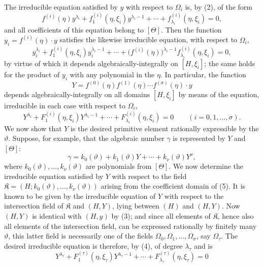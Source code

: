 \documentclass[11pt]{article}
\begin{document}
The irreducible equation satisfied by $y$ with respect to $\Omega_i$ is, by (2),
of the form
\[
 f^{(i)}(\eta)y^{\lambda_i}+f_1^{(i)}(\eta,\xi_i)y^{\lambda_i-1}
+\cdots+f_{\lambda_i}^{(i)}(\eta,\xi_i)=0,
\]
and all coefficients of this equation belong to $[\Theta]$. Then the function
$y_i=f^{(i)}(\eta)\cdot y$ satisfies the likewise irreducible equation, with
respect to $\Omega_i$,
\[
 y_i^{\lambda_i}+f_1^{(i)}(\eta,\xi_i)y_i^{\lambda_i-1}
+\cdots+\bigl(f^{(i)}(\eta)\bigr)^{\lambda_i-1}
 f_{\lambda_i}^{(i)}(\eta,\xi_i)=0,
\]
by virtue of which it depends algebraically-integrally on $[H,\xi_i]$; the same
holds for the product of $y_i$ with any polynomial in the $\eta$. In particular,
the function
\begin{equation}
Y=f^{(0)}(\eta)f^{(1)}(\eta)\cdots f^{(\sigma)}(\eta)\cdot y
\tag{3}
\end{equation}
depends algebraically-integrally on all domains $[H,\xi_i]$ by means of the
equation, irreducible in each case with respect to $\Omega_i$,
\begin{equation}
Y^{\lambda_i}+F_1^{(i)}(\eta,\xi_i)Y^{\lambda_i-1}
+\cdots+F_{\lambda_i}^{(i)}(\eta,\xi_i)=0
\qquad (i=0,1,\ldots,\sigma).
\tag{4}
\end{equation}
We now show that $Y$ is the desired primitive element rationally expressible by
the $\vartheta$. Suppose, for example, that the algebraic number $\gamma$ is
represented by $Y$ and $[\Theta]$:
\begin{equation}
\gamma=k_0(\vartheta)+k_1(\vartheta)Y+\cdots+k_\nu(\vartheta)Y^\nu,
\tag{5}
\end{equation}
where $k_0(\vartheta),\ldots,k_\nu(\vartheta)$ are polynomials from $[\Theta]$.
We now determine the irreducible equation satisfied by $Y$ with respect to the
field
$\mathfrak K=(H;k_0(\vartheta),\ldots,k_\nu(\vartheta))$ arising from the
coefficient domain of (5). It is known to be given by the irreducible equation
of $Y$ with respect to the intersection field of $\mathfrak K$ and $(H,Y)$,
lying between $(H)$ and $(H,Y)$. Now $(H,Y)$ is identical with $(H,y)$ by (3);
and since all elements of $\mathfrak K$, hence also all elements of the
intersection field, can be expressed rationally by finitely many $\vartheta$,
this latter field is necessarily one of the fields
$\Omega_0,\Omega_1,\ldots,\Omega_\sigma$, say $\Omega_\tau$. The desired
irreducible equation is therefore, by (4), of degree $\lambda_\tau$ and is
\begin{equation}
Y^{\lambda_\tau}+F_1^{(\tau)}(\eta,\xi_\tau)Y^{\lambda_\tau-1}
+\cdots+F_{\lambda_\tau}^{(\tau)}(\eta,\xi_\tau)=0
\tag{6}
\end{equation}
\end{document}
